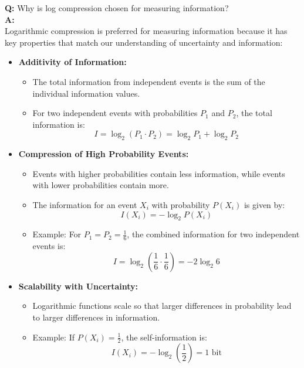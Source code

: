 \documentclass[11pt,a4paper]{book}
\newcounter{qna}[chapter]
\renewcommand{\theqna}{\thechapter.\arabic{qna}}
\newenvironment{questionanswerbox}{
    \refstepcounter{qna}%
    \begin{tcolorbox}[
        enhanced,
        breakable,
        colback=softlavender!10,
        colframe=softlavender!200,
        title={Example~\theqna}, %
        fonttitle=\bfseries,
        coltitle=white,
        colbacktitle=softlavender!200,
        sharp corners,
        boxrule=1pt,
        left=8pt,
        right=8pt,
        top=6pt,
        bottom=6pt
    ]
}{
    \end{tcolorbox}
}
\begin{document}
\begin{questionanswerbox}
    \textbf{Q:} Why is log compression chosen for measuring information?\\
    \textbf{A:}\\
    Logarithmic compression is preferred for measuring information because it has key properties that match our understanding of uncertainty and information:

    \begin{itemize}
        \item \textbf{Additivity of Information:} 
            \begin{itemize}
                \item The total information from independent events is the sum of the individual information values.
                \item For two independent events with probabilities \( P_1 \) and \( P_2 \), the total information is:
                \[
                I = \log_2 \left( P_1 \cdot P_2 \right) = \log_2 P_1 + \log_2 P_2
                \]
            \end{itemize}
        
        \item \textbf{Compression of High Probability Events:} 
            \begin{itemize}
                \item Events with higher probabilities contain less information, while events with lower probabilities contain more.
                \item The information for an event \( X_i \) with probability \( P(X_i) \) is given by:
                \[
                I(X_i) = -\log_2 P(X_i)
                \]
                \item Example: For \( P_1 = P_2 = \frac{1}{6} \), the combined information for two independent events is:
                \[
                I = \log_2 \left( \frac{1}{6} \cdot \frac{1}{6} \right) = -2 \log_2 6
                \]
            \end{itemize}
        
        \item \textbf{Scalability with Uncertainty:} 
            \begin{itemize}
                \item Logarithmic functions scale so that larger differences in probability lead to larger differences in information.
                \item Example: If \( P(X_i) = \frac{1}{2} \), the self-information is:
                \[
                I(X_i) = -\log_2 \left( \frac{1}{2} \right) = 1 \text{ bit}
                \]
            \end{itemize}


\end{itemize}
\end{questionanswerbox}
\end{document}
